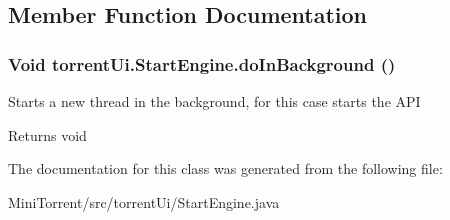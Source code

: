 \subsection{Member Function Documentation}
\hypertarget{classtorrent_ui_1_1_start_engine_a6d3497aa83b900175fd74f5c6a022e9a}{
\subsubsection[{doInBackground}]{\setlength{\rightskip}{0pt plus 5cm}Void torrentUi.StartEngine.doInBackground ()}}
\label{classtorrent_ui_1_1_start_engine_a6d3497aa83b900175fd74f5c6a022e9a}
Starts a new thread in the background, for this case starts the API \begin{DoxyReturn}{Returns}
void 
\end{DoxyReturn}


The documentation for this class was generated from the following file:\begin{DoxyCompactItemize}
\item 
MiniTorrent/src/torrentUi/StartEngine.java\end{DoxyCompactItemize}
